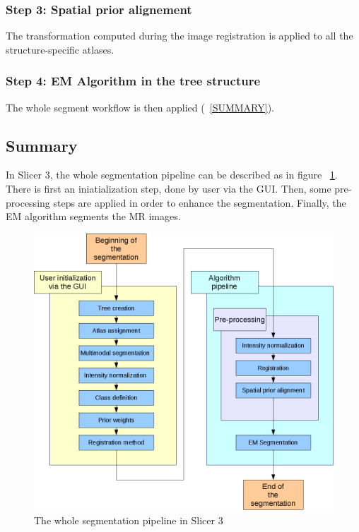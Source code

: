 \subsubsection{Step 3: Spatial prior alignement}
The transformation computed during the image registration is applied to all the structure-specific atlases. 
%
\subsubsection{Step 4: EM Algorithm in the tree structure}
The whole segment workflow is then applied (~\ref{SUMMARY}).
%
\subsection{Summary}
In Slicer 3, the whole segmentation pipeline can be described as in figure ~\ref{fig:Wpipeline}. There is first an iniatialization step, done by user via the GUI. Then, some pre-processing steps are applied in order to enhance the segmentation. Finally, the EM algorithm segments the MR images.

  \begin{figure}[ht]\centering
  \includegraphics[width=1\textwidth]{Images/Graphics/wholepipeline.png}
  \caption{The whole segmentation pipeline in Slicer 3}\label{fig:Wpipeline}
  \end{figure}

%
